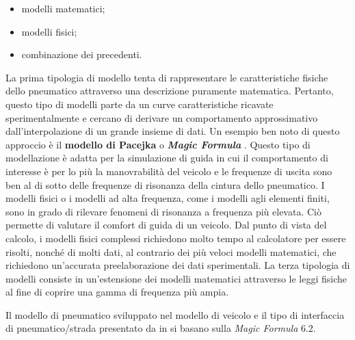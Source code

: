 \begin{itemize}
	\item modelli matematici;
	\item modelli fisici;
	\item combinazione dei precedenti.
\end{itemize}
La prima tipologia di modello tenta di rappresentare le caratteristiche fisiche dello pneumatico attraverso una descrizione puramente matematica. Pertanto, questo tipo di modelli parte da un curve caratteristiche ricavate sperimentalmente e cercano di derivare un comportamento approssimativo dall'interpolazione di un grande insieme di dati. Un esempio ben noto di questo approccio è il \textbf{modello di Pacejka} o \textbf{\textit{Magic Formula}} \cite{hans}. Questo tipo di modellazione è adatta per la simulazione di guida in cui il comportamento di interesse è per lo più la manovrabilità del veicolo e le frequenze di uscita sono ben al di sotto delle frequenze di risonanza della cintura dello pneumatico. I modelli fisici o i modelli ad alta frequenza, come i modelli agli elementi finiti, sono in grado di rilevare fenomeni di risonanza a frequenza più elevata. Ciò permette di valutare il comfort di guida di un veicolo. Dal punto di vista del calcolo, i modelli fisici complessi richiedono molto tempo al calcolatore per essere risolti, nonché di molti dati, al contrario dei più veloci modelli matematici, che richiedono un'accurata preelaborazione dei dati sperimentali. La terza tipologia di modelli consiste in un'estensione dei modelli matematici attraverso le leggi fisiche al fine di coprire una gamma di frequenza più ampia.

Il modello di pneumatico sviluppato nel modello di veicolo e il tipo di interfaccia di pneumatico/strada presentato da \citeauthor{Larcher} in \cite{Larcher} si basano sulla \textit{Magic Formula} 6.2.
%
